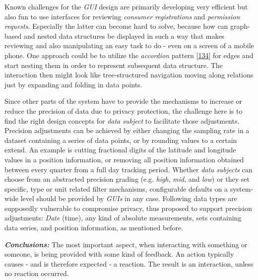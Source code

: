 \documentclass[12pt,english,a4paper,titlepage,cleardoublepage=empty,dottedtoc]{report}
\begin{document}
Known challenges for the \emph{GUI} design are primarily developing very
efficient but also fun to use interfaces for reviewing \emph{consumer
registrations} and \emph{permission requests}. Especially the latter can
become hard to solve, because how can graph-based and nested data
structures be displayed in such a way that makes reviewing and also
manipulating an easy task to do - even on a screen of a mobile phone.
One approach could be to utilize the \emph{accordion} pattern
{[}\protect\hyperlink{ref-web_2016_wikipedia_accordion-gui}{134}{]} for
edges and start nesting them in order to represent subsequent data
structure. The interaction then might look like tree-structured
navigation moving along relations just by expanding and folding in data
points.

Since other parts of the system have to provide the mechanisms to
increase or reduce the precision of data due to privacy protection, the
challenge here is to find the right design concepts for \emph{data
subject} to facilitate those adjustments. Precision adjustments can be
achieved by either changing the sampling rate in a dataset containing a
series of data points, or by rounding values to a certain extend. An
example is cutting fractional digits of the latitude and longitude
values in a position information, or removing all position information
obtained between every quarter from a full day tracking period. Whether
\emph{data subjects} can choose from an abstracted precision grading
(e.g. \emph{high}, \emph{mid}, and \emph{low}) or they set specific,
type or unit related filter mechanisms, configurable defaults on a
system-wide level should be provided by \emph{GUIs} in any case.
Following data types are supposedly vulnerable to compromise privacy,
thus proposed to support precision adjustments: \emph{Date} (time), any
kind of absolute measurements, sets containing data series, and position
information, as mentioned before.

\emph{\textbf{Conclusions:}} The most important aspect, when interacting
with something or someone, is being provided with some kind of feedback.
An action typically causes - and is therefore expected - a reaction. The
result is an interaction, unless no reaction occurred.
\end{document}
